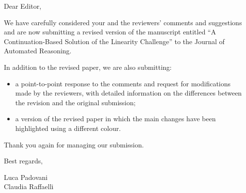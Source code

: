 \documentclass[12pt]{letter}
\begin{document}
\begin{letter}{}
\opening{Dear Editor,}

We have carefully considered your and the reviewers' comments and suggestions
and are now submitting a revised version of the manuscript entitled ``A
Continuation-Based Solution of the Linearity Challenge'' to the Journal of
Automated Reasoning.

In addition to the revised paper, we are also submitting:
\begin{itemize}
\item a point-to-point response to the comments and request for modifications
  made by the reviewers, with detailed information on the differences between
  the revision and the original submission;

\item a version of the revised paper in which the main changes have been
  highlighted using a different colour.
\end{itemize}

Thank you again for managing our submission.

\closing{Best regards,}

Luca Padovani \\Claudia Raffaelli

\end{letter}
\end{document}
